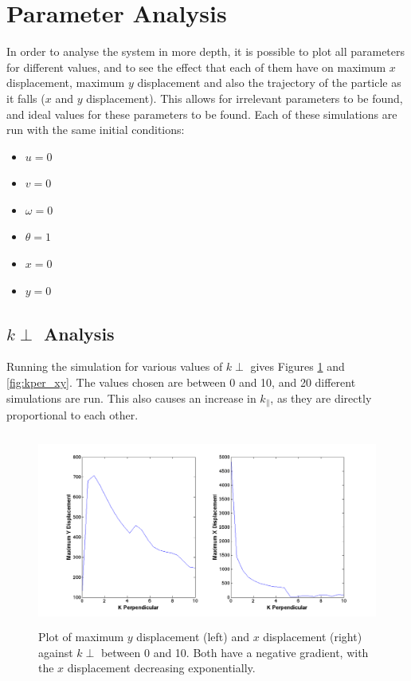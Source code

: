 \section{Parameter Analysis}
\label{params}
In order to analyse the system in more depth, it is possible to plot all parameters for different values, and to see the effect that each of them have on maximum $x$ displacement, maximum $y$ displacement and also the trajectory of the particle as it falls ($x$ and $y$ displacement). This allows for irrelevant parameters to be found, and ideal values for these parameters to be found. \newline \newline
\noindent Each of these simulations are run with the same initial conditions:

\begin{itemize}
\item $u = 0$
\item $v = 0$
\item $\omega = 0$
\item $\theta = 1$
\item $ x = 0$
\item $ y = 0$
\end{itemize}


\subsection{$k{\perp}$ Analysis}
Running the simulation for various values of $k{\perp}$ gives Figures \ref{fig:kpermax} and \ref{fig:kper_xy}. The values chosen are between 0 and 10, and 20 different simulations are run. This also causes an increase in $k_{\parallel}$, as they are directly proportional to each other. 
\begin{figure}[H]
	\centering
	\includegraphics[width=1\textwidth, height=2.5in]{Motion_Graphs/kper_max.png}
	\caption{Plot of maximum $y$ displacement (left) and $x$ displacement (right) against $k{\perp}$ between 0 and 10. Both have a negative gradient, with the $x$ displacement decreasing exponentially.}\label{fig:kpermax}
\end{figure}

